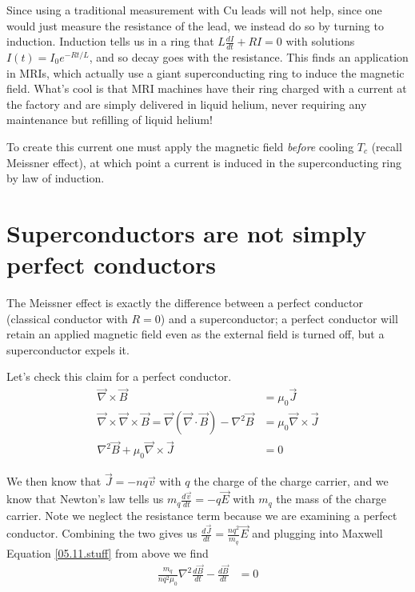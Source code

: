 \documentclass[10pt]{report}
\newcommand{\rd}[2]{\frac{d#1}{d#2}}
\begin{document}
Since using a traditional measurement with Cu leads will not help, since one would just measure the resistance of the lead, we instead do so by turning to induction. Induction tells us in a ring that $L\rd{I}{t} + RI = 0$ with solutions $I(t) = I_0e^{-Rt/L}$, and so decay goes with the resistance. This finds an application in MRIs, which actually use a giant superconducting ring to induce the magnetic field. What's cool is that MRI machines have their ring charged with a current at the factory and are simply delivered in liquid helium, never requiring any maintenance but refilling of liquid helium!

To create this current one must apply the magnetic field \emph{before} cooling $T_c$ (recall Meissner effect), at which point a current is induced in the superconducting ring by law of induction. 

\section{Superconductors are not simply perfect conductors}

The Meissner effect is exactly the difference between a perfect conductor (classical conductor with $R=0$) and a superconductor; a perfect conductor will retain an applied magnetic field even as the external field is turned off, but a superconductor expels it.

Let's check this claim for a perfect conductor.
\begin{align}
    \vec{\nabla} \times \vec{B} &= \mu_0 \vec{J}\\
    \vec{\nabla} \times \vec{\nabla} \times \vec{B} = \vec{\nabla}\left( \vec{\nabla} \cdot \vec{B} \right) - \nabla^2 \vec{B} &= \mu_0 \vec{\nabla} \times \vec{J}\\
    \nabla^2 \vec{B} + \mu_0 \vec{\nabla} \times \vec{J} &= 0\label{05.11.stuff}
\end{align}

We then know that $\vec{J} = -nq\vec{v}$ with $q$ the charge of the charge carrier, and we know that Newton's law tells us $m_q\rd{\vec{v}}{t} = -q\vec{E}$ with $m_q$ the mass of the charge carrier. Note we neglect the resistance term because we are examining a perfect conductor. Combining the two gives us $\rd{\vec{J}}{t} = \frac{nq^2}{m_q}\vec{E}$ and plugging into Maxwell Equation \eqref{05.11.stuff} from above we find
\begin{align}
    \frac{m_q}{nq^2\mu_0}\nabla^2 \rd{\vec{B}}{t} - \rd{\vec{B}}{t} &= 0
\end{align}
\end{document}
